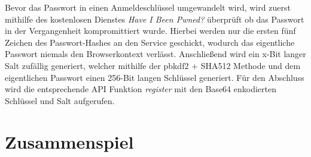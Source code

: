 \label{sec:frontend-registrierung}
Bevor das Passwort in einen Anmeldeschlüssel umgewandelt wird, wird zuerst mithilfe des kostenlosen Dienstes \textit{Have I Been Pwned?} überprüft ob das Passwort in der Vergangenheit kompromittiert wurde. Hierbei werden nur die ersten fünf Zeichen des Passwort-Hashes an den Service geschickt, wodurch das eigentliche Passwort niemals den Browserkontext verlässt. Anschließend wird ein x-Bit langer Salt zufällig generiert, welcher mithilfe der \gls{pbkdf2} + SHA512 Methode und dem eigentlichen Passwort einen 256-Bit langen Schlüssel generiert. Für den Abschluss wird die entsprechende API Funktion \textit{register} mit den Base64 enkodierten Schlüssel und Salt aufgerufen.

\section{Zusammenspiel}
